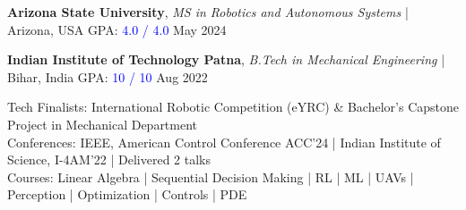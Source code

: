 



\begin{cvhonors}

  \cvhonor
    { {\bf Arizona State University}, \textit{MS in Robotics and Autonomous Systems} | Arizona, USA \hspace{2.5em} GPA: \textcolor{blue}{4.0 / 4.0}} %
    {May 2024} %

  \cvhonor
    { {\bf Indian Institute of Technology Patna}, \textit{B.Tech in Mechanical Engineering} | Bihar, India \hspace{1em} GPA: \textcolor{blue}{10 / 10}} %
    {Aug 2022} %


\end{cvhonors}



\begin{cvparagraph}
{\normalsize{ Tech Finalists:}  International Robotic Competition (eYRC) \& Bachelor's Capstone Project in Mechanical Department \\}
{\normalsize{ Conferences:}   IEEE, American Control Conference ACC'24 | Indian Institute of Science, I-4AM'22 | Delivered 2 talks\\}
{\normalsize{ Courses:}  Linear Algebra | Sequential Decision Making | RL | ML | UAVs | Perception | Optimization | Controls | PDE\\}
\end{cvparagraph}




